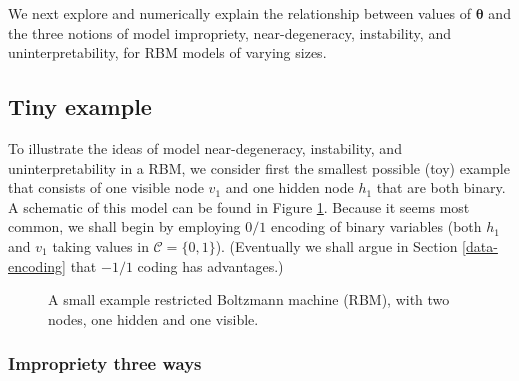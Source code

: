 \documentclass[12pt]{article}
\theoremstyle{definition}
\begin{document}
We next explore and numerically explain the relationship between values
of \(\boldsymbol \theta\) and the three notions of model impropriety,
near-degeneracy, instability, and uninterpretability, for RBM models of
varying sizes.

\subsection{Tiny example}\label{tiny-example}

To illustrate the ideas of model near-degeneracy, instability, and
uninterpretability in a RBM, we consider first the smallest possible
(toy) example that consists of one visible node \(v_1\) and one hidden
node \(h_1\) that are both binary. A schematic of this model can be
found in Figure \ref{fig:toymodel}. Because it seems most common, we
shall begin by employing \(0/1\) encoding of binary variables (both
\(h_1\) and \(v_1\) taking values in \(\mathcal{C} = \{0,1\}\)).
(Eventually we shall argue in Section \ref{data-encoding} that \(-1/1\)
coding has advantages.)
\begin{figure}[ht]
  \centering
  \resizebox{1cm}{!}{}
  \caption{A small example restricted Boltzmann machine (RBM), with two nodes, one hidden and one visible.}
  \label{fig:toymodel}
\end{figure}
\subsubsection{Impropriety three ways}\label{impropriety-three-ways}
\end{document}
